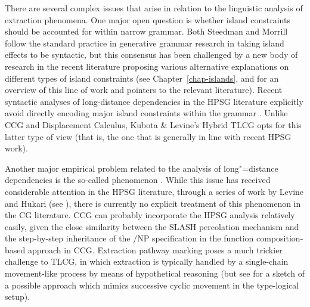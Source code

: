 \documentclass[output=paper]{langsci/langscibook}
\begin{document}
There are several complex issues that arise in relation to the
linguistic analysis of extraction phenomena. One major open question
is whether island constraints should be accounted for within narrow
grammar. Both Steedman and Morrill follow the standard practice in
generative grammar research in taking island effects to be syntactic,
but this consensus has been challenged by a new body of research in
the recent literature proposing various alternative explanations on
different types of island constraints (see Chapter~\ref{chap-islands}, \citet{levine2017}
and \citet{newmeyer2016} for an overview of this line of work and
pointers to the relevant literature). Recent
syntactic analyses of long-distance dependencies in the HPSG
literature explicitly avoid directly encoding major island constraints
within the grammar \citep{Sag2010b,chaves12b}. Unlike 
CCG and Displacement Calculus, Kubota \& Levine's Hybrid TLCG
opts for this latter type of view (that is, the one that is generally in
line with recent HPSG work). 

Another major empirical problem related to the analysis of
long"=distance dependencies is the so-called  phenomenon \citep{mccloskey79,Zaenen83a-u}. While this issue
has received considerable attention in the HPSG literature, through a
series of work by Levine and Hukari (see \citealt{LH2006a}), there is
currently no explicit treatment of this phenomenon in the CG
literature. CCG can probably incorporate the HPSG analysis relatively
easily, given the close similarity between the SLASH percolation
mechanism and the step-by-step inheritance of the $/$NP specification
in the function composition-based approach in CCG. Extraction pathway
marking poses a much trickier challenge to TLCG, in which extraction
is typically handled by a single-chain movement-like process by means
of hypothetical reasoning (but see \citet[Chapter 7]{KubotaLevineBook}
for a sketch of a possible approach which mimics successive cyclic
movement in the type-logical setup).


\end{document}
